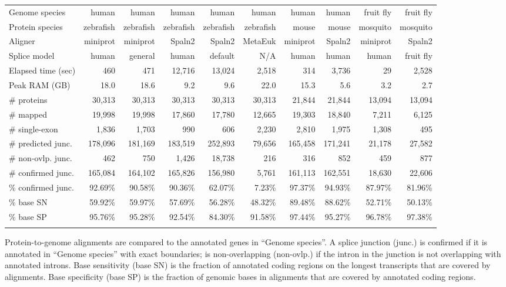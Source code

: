 \documentclass{bioinfo}
\begin{document}
\begin{table*}[!tb]
{\label{tab:eval}
\begin{tabular*}{\textwidth}{@{\extracolsep{\fill}}lrrrrrrrrr}
\toprule
Genome species     & human   & human   & human   & human   & human   & human   & human   &fruit fly&fruit fly \\
Protein species    &zebrafish&zebrafish&zebrafish&zebrafish&zebrafish& mouse   & mouse   & mosquito& mosquito \\
Aligner            & miniprot& miniprot& Spaln2  & Spaln2  & MetaEuk & miniprot& Spaln2  & miniprot& Spaln2 \\
Splice model       & human   & general & human   & default &     N/A & human   & human   & human   &fruit fly \\
\midrule                                                                                 
Elapsed time (sec) &     460 &     471 &  12,716 &  13,024 &   2,518 &     314 &   3,736 &      29 &   2,528 \\
Peak RAM (GB)      &    18.0 &    18.6 &     9.2 &     9.6 &    22.0 &    15.3 &     5.6 &     3.2 &     2.7 \\
\# proteins        &  30,313 &  30,313 &  30,313 &  30,313 &  30,313 &  21,844 &  21,844 &  13,094 &  13,094 \\
\# mapped          &  19,998 &  19,998 &  17,860 &  17,780 &  12,665 &  19,303 &  18,840 &   7,211 &   6,125 \\
\# single-exon     &   1,836 &   1,703 &     990 &     606 &   2,230 &   2,810 &   1,975 &   1,308 &     495 \\
\# predicted junc. & 178,096 & 181,169 & 183,519 & 252,893 &  79,656 & 165,458 & 171,241 &  21,178 &  27,582 \\
\# non-ovlp. junc. &     462 &     750 &   1,426 &  18,738 &     216 &     316 &     852 &     459 &     877 \\
\# confirmed junc. & 165,084 & 164,102 & 165,826 & 156,980 &   5,761 & 161,113 & 162,551 &  18,630 &  22,606 \\
\% confirmed junc. & 92.69\% & 90.58\% & 90.36\% & 62.07\% &  7.23\% & 97.37\% & 94.93\% & 87.97\% & 81.96\% \\
\% base SN         & 59.92\% & 59.97\% & 57.69\% & 56.28\% & 48.32\% & 89.48\% & 88.62\% & 52.71\% & 50.13\% \\
\% base SP         & 95.76\% & 95.28\% & 92.54\% & 84.30\% & 91.58\% & 97.44\% & 95.27\% & 96.78\% & 97.38\% \\
\botrule
\end{tabular*}
}{Protein-to-genome alignments are compared to the annotated genes in ``Genome
species''. A splice junction (junc.) is confirmed if it is annotated in
``Genome species'' with exact boundaries; is non-overlapping (non-ovlp.) if the
intron in the junction is not overlapping with annotated introns. Base
sensitivity (base SN) is the fraction of annotated coding regions on the
longest transcripts that are covered by alignments. Base specificity (base SP)
is the fraction of genomic bases in alignments that are covered by annotated
coding regions.}
\end{table*}
\end{document}
